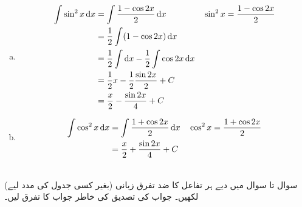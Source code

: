 \begin{enumerate}[a.]
\item
\begin{align*}
\int\sin^2x\dif x&=\int\frac{1-\cos 2x}{2}\dif x&&\sin^2x=\frac{1-\cos 2x}{2}\\
&=\frac{1}{2}\int(1-\cos 2x)\dif x\\
&=\frac{1}{2}\int \dif x-\frac{1}{2}\int \cos 2x\dif x\\
&=\frac{1}{2}x-\frac{1}{2}\frac{\sin 2x}{2}+C\\
&=\frac{x}{2}-\frac{\sin 2x}{4}+C
\end{align*}
\item
\begin{align*}
\int\cos^2x\dif x&=\int\frac{1+\cos 2x}{2}\dif x&&\cos^2x=\frac{1+\cos 2x}{2}\\
&=\frac{x}{2}+\frac{\sin 2x}{4}+C
\end{align*}
\end{enumerate}

\\
سوال  تا سوال  میں دیے  ہر تفاعل کا ضد تفرق زبانی (بغیر کسی جدول کی مدد لیے) لکھیں۔ جواب کی تصدیق کی خاطر جواب کا تفرق لیں۔

